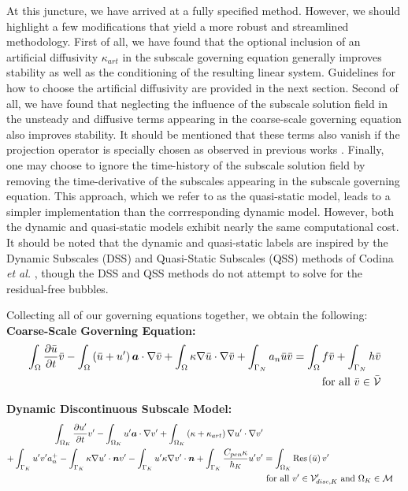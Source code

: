 \documentclass[11pt]{article}
\begin{document}
At this juncture, we have arrived at a fully specified method.  However, we should highlight a few modifications that yield a more robust and streamlined methodology.  First of all, we have found that the optional inclusion of an artificial diffusivity $\kappa_{art}$ in the subscale governing equation generally improves stability as well as the conditioning of the resulting linear system.  Guidelines for how to choose the artificial diffusivity are provided in the next section.  Second of all, we have found that neglecting the influence of the subscale solution field in the unsteady and diffusive terms appearing in the coarse-scale governing equation also improves stability.  It should be mentioned that these terms also vanish if the projection operator is specially chosen as observed in previous works \cite{Hughes07}.  Finally, one may choose to ignore the time-history of the subscale solution field by removing the time-derivative of the subscales appearing in the subscale governing equation.  This approach, which we refer to as the quasi-static model, leads to a simpler implementation than the corrresponding dynamic model.  However, both the dynamic and quasi-static models exhibit nearly the same computational cost.  It should be noted that the dynamic and quasi-static labels are inspired by the Dynamic Subscales (DSS) and Quasi-Static Subscales (QSS) methods of Codina \textit{et al.} \cite{Codina07}, though the DSS and QSS methods do not attempt to solve for the residual-free bubbles.

Collecting all of our governing equations together, we obtain the following:\\

\noindent \textbf{Coarse-Scale Governing Equation:}
\begin{equation}
\begin{aligned}
\int_\Omega \frac{\partial \bar{u}}{\partial t} \bar{v} -  \int_\Omega \left(\bar{u} + u'\right) \bm{a} \cdot \nabla \bar{v} +  \int_\Omega \kappa \nabla \bar{u} \cdot \nabla \bar{v} + \int_{\Gamma_N} a_n \bar{u} \bar{v} = \int_\Omega f \bar{v} + \int_{\Gamma_N} h \bar{v} \\ \textup{ for all } \bar{v} \in \bar{\mathcal{V}}
\end{aligned}
\end{equation}

\noindent \textbf{Dynamic Discontinuous Subscale Model:}
\begin{equation}
\begin{aligned}
\int_{\Omega_K} \frac{\partial u'}{\partial t} v' -  \int_{\Omega_K} u' \bm{a} \cdot \nabla v' + \int_{\Omega_K} \left( \kappa + \kappa_{art} \right) \nabla u' \cdot \nabla v' \\ + \int_{\Gamma_K} u' v' a_n^+ - \int_{\Gamma_K} \kappa \nabla u' \cdot \bm{n} v' - \int_{\Gamma_K} u' \kappa \nabla v' \cdot \bm{n} + \int_{\Gamma_K} \frac{C_{pen} \kappa}{h_K} u' v' &= \int_{\Omega_K} \textup{Res}\left(\bar{u}\right) v' \\ & \textup{ for all } v' \in \mathcal{V}'_{disc,K} \textup{ and } \Omega_K \in \mathcal{M}
\end{aligned}
\end{equation}
\end{document}
